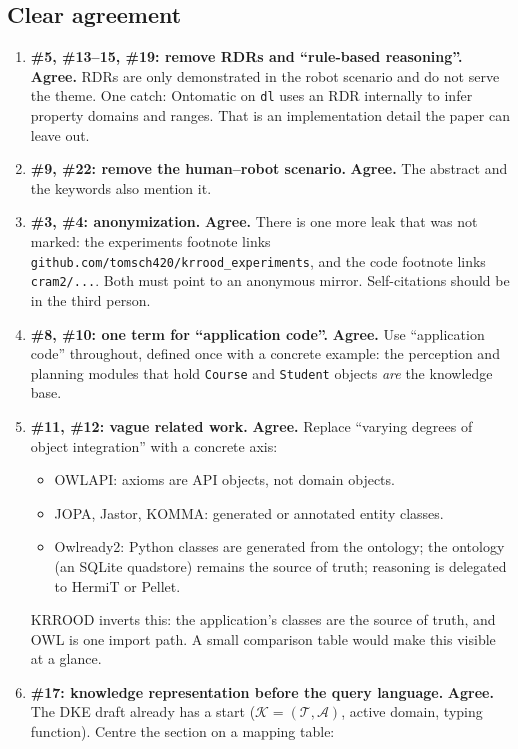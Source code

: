 \documentclass[11pt]{article}
\newcommand{\code}[1]{\texttt{#1}}
\newcommand{\agree}{\textcolor{ok}{\textbf{Agree.}}}
\begin{document}
\subsection{Clear agreement}
\begin{enumerate}[label=\textbf{3.\arabic*}]
  \item \textbf{\#5, \#13--15, \#19: remove RDRs and ``rule-based reasoning''.} \agree{} RDRs are only demonstrated in the robot scenario and do not serve the theme. One catch: Ontomatic on \code{dl} uses an RDR internally to infer property domains and ranges. That is an implementation detail the paper can leave out.
  \item \textbf{\#9, \#22: remove the human--robot scenario.} \agree{} The abstract and the keywords also mention it.
  \item \textbf{\#3, \#4: anonymization.} \agree{} There is one more leak that was not marked: the experiments footnote links \code{github.com/tomsch420/krrood\_experiments}, and the code footnote links \code{cram2/...}. Both must point to an anonymous mirror. Self-citations should be in the third person.
  \item \textbf{\#8, \#10: one term for ``application code''.} \agree{} Use ``application code'' throughout, defined once with a concrete example: the perception and planning modules that hold \code{Course} and \code{Student} objects \emph{are} the knowledge base.
  \item \textbf{\#11, \#12: vague related work.} \agree{} Replace ``varying degrees of object integration'' with a concrete axis:
  \begin{itemize}
    \item OWLAPI: axioms are API objects, not domain objects.
    \item JOPA, Jastor, KOMMA: generated or annotated entity classes.
    \item Owlready2: Python classes are generated from the ontology; the ontology (an SQLite quadstore) remains the source of truth; reasoning is delegated to HermiT or Pellet.
  \end{itemize}
  KRROOD inverts this: the application's classes are the source of truth, and OWL is one import path. A small comparison table would make this visible at a glance.
  \item \textbf{\#17: knowledge representation before the query language.} \agree{} The DKE draft already has a start ($\mathcal{K}=(\mathcal{T},\mathcal{A})$, active domain, typing function). Centre the section on a mapping table:
  \begin{center}\small

\end{center}
\end{enumerate}
\end{document}

